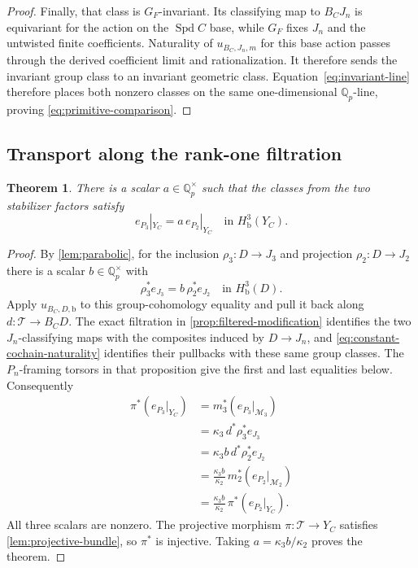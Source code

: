 \documentclass[11pt]{article}
\numberwithin{equation}{section}
\newtheorem{theorem}{Theorem}[section]
\theoremstyle{definition}
\theoremstyle{remark}
\begin{document}
\begin{proof}
Finally, that class is $G_F$-invariant.  Its classifying map to
$B_CJ_n$ is equivariant for the action on the $\operatorname{Spd} C$ base, while
$G_F$ fixes $J_n$ and the untwisted finite coefficients.  Naturality
of $u_{B_C,J_n,m}$ for this base action passes through the derived
coefficient limit and rationalization.  It therefore sends the
invariant group class to an invariant geometric class.
Equation~\eqref{eq:invariant-line} therefore places both nonzero
classes on the same one-dimensional $\mathbb Q_p$-line, proving
\cref{eq:primitive-comparison}.
\end{proof}

\subsection{Transport along the rank-one filtration}

\begin{theorem}\label{thm:geometric-transport}
There is a scalar $a\in\mathbb Q_p^\times$ such that the classes from the two
stabilizer factors satisfy
\begin{equation}\label{eq:geometric-transport}
 e_{P_3}|_{Y_C}=a\,e_{P_2}|_{Y_C}
       \quad\text{in }H^3_{\mathrm b}(Y_C).
\end{equation}
\end{theorem}

\begin{proof}
By \cref{lem:parabolic}, for the inclusion $\rho_3:D\to J_3$ and
projection $\rho_2:D\to J_2$ there is a scalar $b\in\mathbb Q_p^\times$
with
\[
 \rho_3^*e_{J_3}=b\,\rho_2^*e_{J_2}
       \quad\text{in }H^3_{\mathrm b}(D).
\]
Apply $u_{B_C,D,\mathrm b}$ to this group-cohomology equality and
pull it back along $d:\mathcal T\to B_CD$.
The exact filtration in \cref{prop:filtered-modification} identifies
the two $J_n$-classifying maps with the composites induced by
$D\to J_n$, and \eqref{eq:constant-cochain-naturality} identifies
their pullbacks with these same group classes.  The $P_n$-framing
torsors in that proposition give the first and last equalities below.
Consequently
\[
 \begin{aligned}
 \pi^*(e_{P_3}|_{Y_C})
   &=m_3^*(e_{P_3}|_{\mathcal M_3})\\
   &=\kappa_3\,d^*\rho_3^*e_{J_3}\\
   &=\kappa_3b\,d^*\rho_2^*e_{J_2}\\
   &=\frac{\kappa_3b}{\kappa_2}\,
                  m_2^*(e_{P_2}|_{\mathcal M_2})\\
   &=\frac{\kappa_3b}{\kappa_2}\,\pi^*(e_{P_2}|_{Y_C}).
 \end{aligned}
\]
All three scalars are nonzero.  The projective morphism
$\pi:\mathcal T\to Y_C$ satisfies
\cref{lem:projective-bundle}, so $\pi^*$ is injective.
Taking $a=\kappa_3b/\kappa_2$ proves the theorem.
\end{proof}
\end{document}
